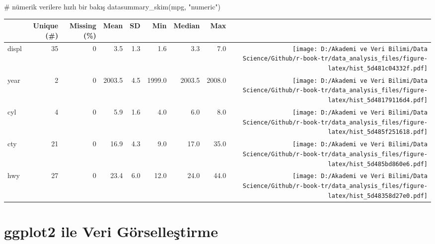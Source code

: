 \documentclass[
  letterpaper,
  DIV=11,
  numbers=noendperiod]{scrreprt}
\newenvironment{Shaded}{\begin{snugshade}}{\end{snugshade}}
\newcommand{\CommentTok}[1]{\textcolor[rgb]{0.37,0.37,0.37}{#1}}
\newcommand{\FunctionTok}[1]{\textcolor[rgb]{0.28,0.35,0.67}{#1}}
\newcommand{\NormalTok}[1]{\textcolor[rgb]{0.00,0.23,0.31}{#1}}
\newcommand{\StringTok}[1]{\textcolor[rgb]{0.13,0.47,0.30}{#1}}
\begin{document}
\begin{Shaded}
\begin{Highlighting}[]
\CommentTok{\# nümerik verilere hızlı bir bakış}
\FunctionTok{datasummary\_skim}\NormalTok{(mpg, }\StringTok{"numeric"}\NormalTok{)}
\end{Highlighting}
\end{Shaded}

\begin{table}
\centering
\begin{tabular}[t]{lrrrrrrr>{}r}
\toprule
  & Unique (\#) & Missing (\%) & Mean & SD & Min & Median & Max &   \\
\midrule
displ & 35 & 0 & \num{3.5} & \num{1.3} & \num{1.6} & \num{3.3} & \num{7.0} & \texttt{[image: D:/Akademi ve Veri Bilimi/Data Science/Github/r-book-tr/data\_analysis\_files/figure-latex/hist\_5d481c04332f.pdf]}\\
year & 2 & 0 & \num{2003.5} & \num{4.5} & \num{1999.0} & \num{2003.5} & \num{2008.0} & \texttt{[image: D:/Akademi ve Veri Bilimi/Data Science/Github/r-book-tr/data\_analysis\_files/figure-latex/hist\_5d48179116d4.pdf]}\\
cyl & 4 & 0 & \num{5.9} & \num{1.6} & \num{4.0} & \num{6.0} & \num{8.0} & \texttt{[image: D:/Akademi ve Veri Bilimi/Data Science/Github/r-book-tr/data\_analysis\_files/figure-latex/hist\_5d485f251618.pdf]}\\
cty & 21 & 0 & \num{16.9} & \num{4.3} & \num{9.0} & \num{17.0} & \num{35.0} & \texttt{[image: D:/Akademi ve Veri Bilimi/Data Science/Github/r-book-tr/data\_analysis\_files/figure-latex/hist\_5d485bd860e6.pdf]}\\
hwy & 27 & 0 & \num{23.4} & \num{6.0} & \num{12.0} & \num{24.0} & \num{44.0} & \texttt{[image: D:/Akademi ve Veri Bilimi/Data Science/Github/r-book-tr/data\_analysis\_files/figure-latex/hist\_5d48358d27e0.pdf]}\\
\bottomrule
\end{tabular}
\end{table}


\hypertarget{ggplot2-ile-veri-guxf6rselleux15ftirme}{%
\chapter*{ggplot2 ile Veri
Görselleştirme}\label{ggplot2-ile-veri-guxf6rselleux15ftirme}}

\end{document}
